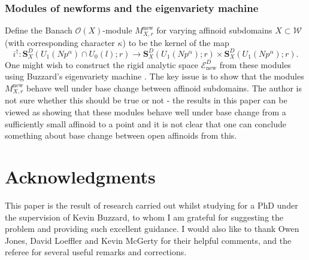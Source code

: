 \documentclass[a4paper, notitlepage]{amsart}
\newcommand{\OO}{\ensuremath{\mathscr{O}}\xspace}
\newcommand{\OCN}{\ensuremath{\mathbf{S}^D_{X}(U_1(Np^\alpha);r)}\xspace}
\newcommand{\OCNl}{\ensuremath{\mathbf{S}^D_{X}(U_1(Np^\alpha)\cap U_0(l);r)}\xspace}
\begin{document}
\subsubsection{Modules of newforms and the eigenvariety machine}Define the Banach $\OO(X)$-module $M_{X,r}^{\mathrm{new}}$ for varying affinoid subdomains $X \subset \mathscr{W}$ (with corresponding character $\kappa$) to be the kernel of the map $$i^\dagger: \OCNl\rightarrow \OCN\times\OCN.$$ One might wish to construct the rigid analytic space $\mathscr{E}^D_{\mathrm{new}}$ from these modules using Buzzard's eigenvariety machine \cite{Bu2}. The key issue is to show that the modules $M_{X,r}^{\mathrm{new}}$ behave well under base change between affinoid subdomains. The author is not sure whether this should be true or not - the results in this paper can be viewed as showing that these modules behave well under base change from a sufficiently small affinoid to a point and it is not clear that one can conclude something about base change between open affinoids from this.

\section{Acknowledgments}
This paper is the result of research carried out whilst studying for a PhD under the supervision of Kevin Buzzard, to whom I am grateful for suggesting the problem and providing such excellent guidance. I would also like to thank Owen Jones, David Loeffler and Kevin McGerty for their helpful comments, and the referee for several useful remarks and corrections.


\end{document}
